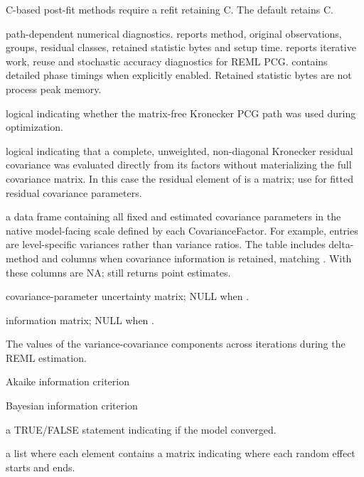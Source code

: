 \documentclass[a4paper]{book}
\begin{document}
\begin{Value}
\begin{ldescription}
C-based post-fit methods require a refit retaining C. The default retains C.
\item[\code{engineDiagnostics}] path-dependent numerical diagnostics.
 reports method, original observations, groups, residual
classes, retained statistic bytes and setup time.  reports iterative
work, reuse and stochastic accuracy diagnostics for REML PCG.
 contains detailed phase timings when explicitly enabled.
Retained statistic bytes are not process peak memory.
\item[\code{pcgMatrixFree}] logical indicating whether the matrix-free Kronecker PCG
path was used during optimization.
\item[\code{residualCovarianceCompact}] logical indicating that a complete, unweighted,
non-diagonal Kronecker residual covariance was evaluated directly from its
factors without materializing the full covariance matrix. In this case the
residual element of  is a  matrix; use
 for fitted residual covariance parameters.
\item[\code{covParNative}] a data frame containing all fixed and estimated covariance
parameters in the native model-facing scale defined by each CovarianceFactor.
For example,  entries are level-specific variances rather than
variance ratios. The table includes delta-method  and
 columns when covariance information is retained, matching
. With  these
columns are NA;  still returns point estimates.
\item[\code{theta\_se}] covariance-parameter uncertainty matrix; NULL when
.
\item[\code{InfMat}] information matrix; NULL when
.
\item[\code{monitor}] The values of the variance-covariance components across iterations 
during the REML estimation.
\item[\code{AIC}] Akaike information criterion
\item[\code{BIC}] Bayesian information criterion
\item[\code{convergence}] a TRUE/FALSE statement indicating if the model converged.
\item[\code{partitions}] a list where each element contains a matrix indicating where 
each random effect starts and ends.

\end{ldescription}
\end{Value}
\end{document}
